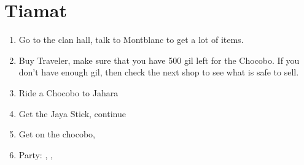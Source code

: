 \chapter{Tiamat}

\begin{enumerate}
	\item Go to the clan hall, talk to Montblanc to get a lot of items.
	\item Buy Traveler, make sure that you have 500 gil left for the Chocobo. If you don't have enough gil, then check the next shop to see what is safe to sell.
	\item Ride a Chocobo to Jahara
	\item Get the Jaya Stick, continue
	\item Get on the chocobo, 
	\item Party: \vaan, \basch, \penelo
\end{enumerate}
